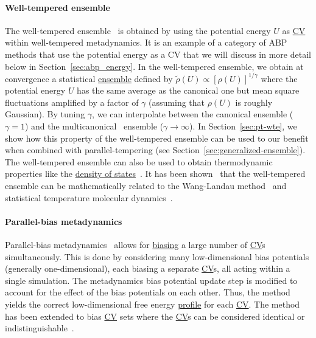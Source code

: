 \documentclass[9pt,review]{livecoms}
\begin{document}
\paragraph{Well-tempered ensemble}
\label{sec:wtensemble}
The well-tempered ensemble~\cite{Bonomi-PRL-2010} is obtained by using the potential energy $U$ as \hyperlink{ref:CV} {CV} within well-tempered metadynamics. It is an example of a category of ABP methods that use the potential energy as a CV that we will discuss in more detail below in Section~\ref{sec:abp_energy}. In the well-tempered ensemble, we obtain at convergence a statistical \hyperlink{ref:Ensemble} {ensemble} defined by $\tilde{\rho}(U) \propto [\rho(U)]^{1/\gamma}$ where the potential energy $U$ has the same average as the canonical one but mean square fluctuations amplified by a factor of $\gamma$ (assuming that $\rho(U)$ is roughly Gaussian). By tuning $\gamma$, we can interpolate between the canonical ensemble ($\gamma=1$) and the multicanonical~\cite{Berg1992_Multicanonical} ensemble ($\gamma \to \infty$). In Section~\ref{sec:pt-wte}, we show how this property of the well-tempered ensemble can be used to our benefit when combined with parallel-tempering (see Section~\ref{sec:generalized-ensemble}). The well-tempered ensemble can also be used to obtain thermodynamic properties like the \hyperlink{ref:density_of_states}{density of states}~\cite{Valsson-JCTC-2013}. It has been shown~\cite{Junghans2014wte-wl} that the well-tempered ensemble can be mathematically related to the Wang-Landau method~\cite{wang-landau:prl:2001:wang-landau} and statistical temperature molecular dynamics~\cite{Kim2006_PRL_STMD}.

\paragraph{Parallel-bias metadynamics}
\label{sec:pb-metad}
Parallel-bias metadynamics~\cite{Pfaendtner2015_pbmetad} allows for \hyperlink{ref:biasingE} {biasing} a large number of \hyperlink{ref:CV} {CV}s simultaneously. This is done by considering many low-dimensional bias potentials (generally one-dimensional), each biasing a separate \hyperlink{ref:CV} {CV}s, all acting within a single simulation.  The metadynamics bias potential update step is modified to account for the effect of the bias potentials on each other. Thus, the method yields the correct low-dimensional free energy \hyperlink{ref:FES} {profile} for each \hyperlink{ref:CV} {CV}. The method has been extended to bias \hyperlink{ref:CV} {CV} sets where the \hyperlink{ref:CV} {CV}s can be considered identical or indistinguishable~\cite{Prakash2018_pbmetad-families}.
\end{document}
